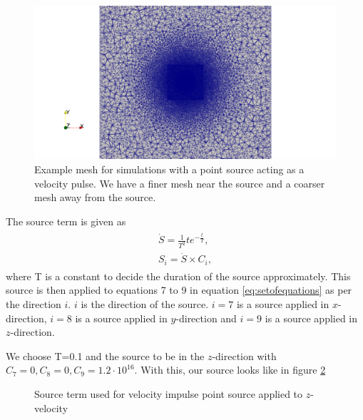 \begin{figure}[htpb]
    \centering
    \includegraphics[width=\linewidth]{figures/mesh_loh1.png}
    \caption{Example mesh for simulations with a point source acting as a velocity pulse. We have a finer mesh near the source and a coarser mesh away from the source.}
    \label{fig:mesh-loh1}
\end{figure}

The source term is given as 
\begin{align}
    \begin{split}
        \dot{S} = \frac{1}{T^2} t e^{-\frac{t}{T}} , \\
        S_i = \dot{S} \times C_i ,
    \end{split}
    \label{eq:source}
\end{align}
where T is a constant to decide the duration of the source approximately. This source is then applied to equations 7 to 9 in equation \ref{eq:setofequations} as per the direction
$i$. $i$ is the direction of the source. $i=7$ is a source applied in $x$-direction,
$i=8$ is a source applied in $y$-direction and $i=9$ is a source applied in $z$-direction.

We choose T=0.1 and the source to be in the $z$-direction with $C_7 = 0, C_8 = 0, C_9 = 1.2 \cdot 10^{16}$. With this, our source looks like in figure \ref{fig:source}

\begin{figure}[htpb]
    \centering
    \caption{Source term used for velocity impulse point source applied to $z$-velocity}
    \label{fig:source}
\end{figure}

